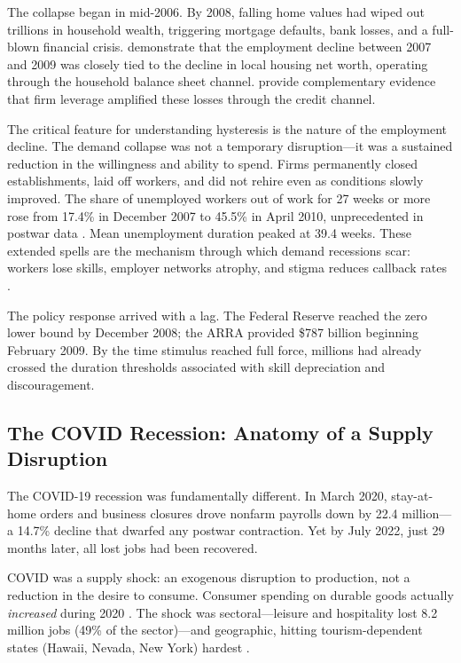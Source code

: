 \documentclass[12pt]{article}
\begin{document}
The collapse began in mid-2006. By 2008, falling home values had wiped out trillions in household wealth, triggering mortgage defaults, bank losses, and a full-blown financial crisis. \citet{mian2014explains} demonstrate that the employment decline between 2007 and 2009 was closely tied to the decline in local housing net worth, operating through the household balance sheet channel. \citet{giroud2017firm} provide complementary evidence that firm leverage amplified these losses through the credit channel.

The critical feature for understanding hysteresis is the nature of the employment decline. The demand collapse was not a temporary disruption---it was a sustained reduction in the willingness and ability to spend. Firms permanently closed establishments, laid off workers, and did not rehire even as conditions slowly improved. The share of unemployed workers out of work for 27 weeks or more rose from 17.4\% in December 2007 to 45.5\% in April 2010, unprecedented in postwar data \citep{kroft2016long}. Mean unemployment duration peaked at 39.4 weeks. These extended spells are the mechanism through which demand recessions scar: workers lose skills, employer networks atrophy, and stigma reduces callback rates \citep{kroft2016long, elsby2010labor}.

The policy response arrived with a lag. The Federal Reserve reached the zero lower bound by December 2008; the ARRA provided \$787 billion beginning February 2009. By the time stimulus reached full force, millions had already crossed the duration thresholds associated with skill depreciation and discouragement.

\subsection{The COVID Recession: Anatomy of a Supply Disruption}

The COVID-19 recession was fundamentally different. In March 2020, stay-at-home orders and business closures drove nonfarm payrolls down by 22.4 million---a 14.7\% decline that dwarfed any postwar contraction. Yet by July 2022, just 29 months later, all lost jobs had been recovered.

COVID was a supply shock: an exogenous disruption to production, not a reduction in the desire to consume. Consumer spending on durable goods actually \textit{increased} during 2020 \citep{guerrieri2022macroeconomic}. The shock was sectoral---leisure and hospitality lost 8.2 million jobs (49\% of the sector)---and geographic, hitting tourism-dependent states (Hawaii, Nevada, New York) hardest \citep{cajner2020us}.
\end{document}
